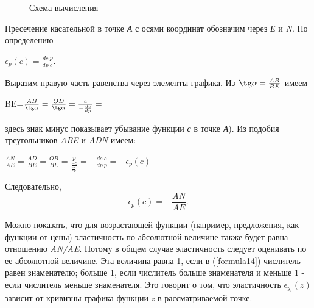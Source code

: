 \documentclass[12pt, 4paper]{book}
\begin{document}
{\par
\begin{figure}[h]
	\caption{Схема вычисления}
	\label{image2.2}	
\end{figure}
Пресечение касательной в точке \textit{А} с осями координат обозначим через \textit{Е} и \textit{N}. По определению
\begin{center}
$\epsilon_p(c)=\frac{dc}{dp}\frac{p}{c}$.
\end{center}
\par

Выразим правую часть равенства через элементы графика. Из $\tg \alpha = \frac{AB}{BE}$ имеем
\begin{center}
BE=$\frac{AB}{\tg \alpha }=\frac{OD}{\tg \alpha }=\frac{c}{-\frac{dc}{dp}}=$
\end{center}
здесь знак минус показывает убывание функции \textit{с} в точке \textit{А}). Из подобия треугольников \textit{ABE} и \textit{ADN} имеем: 
\begin{center}
$\frac{AN}{AE}=\frac{AD}{BE}=\frac{OB}{BE}=\frac{p}{\frac{-c}{\frac{dc}{dp}}}=-\frac{dc}{dp}\frac{c}{p}=-\epsilon_p(c)$
\end{center}
\par

Следовательно, 
\begin{equation}
\label{formula15}
\epsilon_p(c)=-\frac{AN}{AE}.
\end{equation}

\par
Можно показать, что для возрастающей функции (например, предложения, как функции от цены) эластичность по абсолютной величине также будет равна отношению \textit{AN/AE}. Потому в общем случае эластичность следует оценивать по ее абсолютной величине. Эта величина равна 1, если в (\ref{formula14}) числитель равен знаменателю; больше 1, если числитель больше знаменателя и меньше 1 - если числитель меньше знаменателя. Это говорит о том, что эластичность $\epsilon_{y_{i}}(z)$ зависит от кривизны графика функции \textit{z} в рассматриваемой точке.

}
\end{document}
